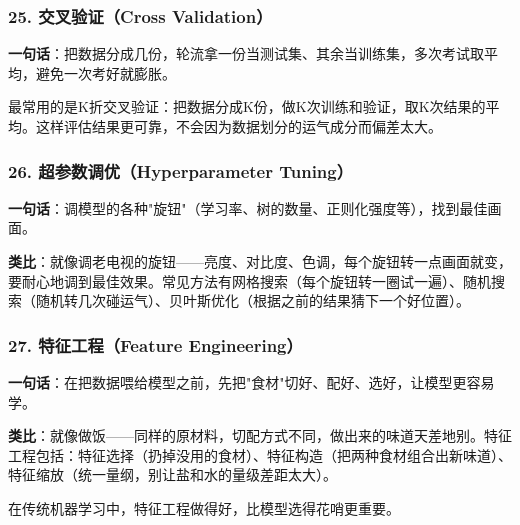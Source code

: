 \documentclass[12pt,a4paper]{ctexart}
\begin{document}
\subsubsection{25. 交叉验证（Cross Validation）}

\begin{funbox}
\textbf{一句话}：把数据分成几份，轮流拿一份当测试集、其余当训练集，多次考试取平均，避免一次考好就膨胀。

最常用的是K折交叉验证：把数据分成K份，做K次训练和验证，取K次结果的平均。这样评估结果更可靠，不会因为数据划分的运气成分而偏差太大。
\end{funbox}

\subsubsection{26. 超参数调优（Hyperparameter Tuning）}

\begin{funbox}
\textbf{一句话}：调模型的各种"旋钮"（学习率、树的数量、正则化强度等），找到最佳画面。

\textbf{类比}：就像调老电视的旋钮——亮度、对比度、色调，每个旋钮转一点画面就变，要耐心地调到最佳效果。常见方法有网格搜索（每个旋钮转一圈试一遍）、随机搜索（随机转几次碰运气）、贝叶斯优化（根据之前的结果猜下一个好位置）。
\end{funbox}

\subsubsection{27. 特征工程（Feature Engineering）}

\begin{funbox}
\textbf{一句话}：在把数据喂给模型之前，先把"食材"切好、配好、选好，让模型更容易学。

\textbf{类比}：就像做饭——同样的原材料，切配方式不同，做出来的味道天差地别。特征工程包括：特征选择（扔掉没用的食材）、特征构造（把两种食材组合出新味道）、特征缩放（统一量纲，别让盐和水的量级差距太大）。

在传统机器学习中，特征工程做得好，比模型选得花哨更重要。
\end{funbox}
\end{document}
